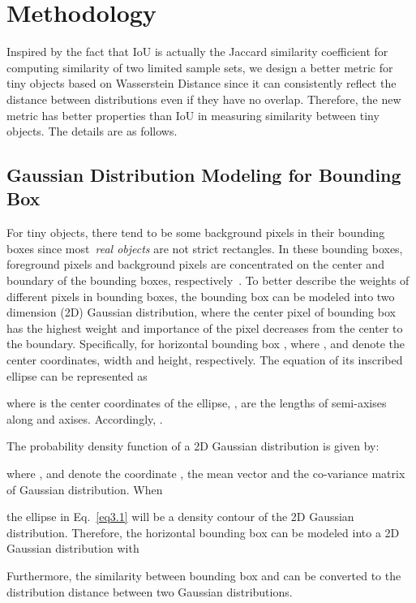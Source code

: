 \documentclass{article}
\begin{document}
\section{Methodology}

Inspired by the fact that IoU is actually the Jaccard similarity coefficient for computing similarity of two limited sample sets, we design a better metric for tiny objects based on Wasserstein Distance since it can consistently reflect the distance between distributions even if they have no overlap. Therefore, the new metric has better properties than IoU in measuring similarity between tiny objects. The details are as follows.

\subsection{Gaussian Distribution Modeling for Bounding Box}
\label{sec::gaussianmodeling}
For tiny objects, there tend to be some background pixels in their bounding boxes since most~\textit{real objects} are not strict rectangles. In these bounding boxes, foreground pixels and background pixels are concentrated on the center and boundary of the bounding boxes, respectively~\cite{CenterMap-Net_2020_TGRS}. To better describe the weights of different pixels in bounding boxes, the bounding box can be modeled into two dimension (2D) Gaussian distribution, where the center pixel of bounding box has the highest weight and importance of the pixel decreases from the center to the boundary. Specifically, for horizontal bounding box , where ,  and  denote the center coordinates, width and height, respectively. The equation of its inscribed ellipse can be represented as 

where  is the center coordinates of the ellipse, ,  are the lengths of semi-axises along  and  axises. Accordingly, .

The probability density function of a 2D Gaussian distribution is given by:

where ,  and  denote the coordinate , the mean vector and the co-variance matrix of Gaussian distribution. When

the ellipse in Eq.~\ref{eq3.1} will be a density contour of the 2D Gaussian distribution. Therefore, the horizontal bounding box  can be modeled into a 2D Gaussian distribution  with 


Furthermore, the similarity between bounding box  and  can be converted to the distribution distance between two Gaussian distributions.
\end{document}
